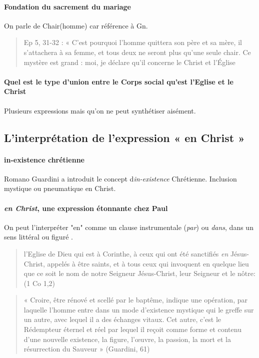  \paragraph{Fondation du sacrement du mariage} On parle de Chair(homme) car référence à Gn. 
 
 \begin{quote}
     Ep 5, 31-32 : « C’est pourquoi l’homme quittera son père et sa mère, il s’attachera à sa femme, et tous deux ne seront plus qu’une seule chair. Ce mystère est grand : moi, je déclare qu’il concerne le Christ et l’Église
 \end{quote}
 
 \paragraph{Quel est le type d'union entre le Corps social qu'est l'Eglise et le Christ} Plusieurs expressions mais qu'on ne peut synthétiser aisément.
 
 \subsection{L’interprétation de l’expression  « en Christ » }
 \paragraph{in-existence chrétienne}
 Romano Guardini a introduit le concept d\textit{in-existence} Chrétienne. Inclusion mystique ou pneumatique en Christ. 
 
 \paragraph{\textit{en Christ}, une expression étonnante chez Paul} On peut l'interpréter "en" comme un clause instrumentale (\textit{par}) ou \textit{dans}, dans un sens littéral ou figuré .
  
 \begin{quote}
      l'Eglise de Dieu qui est à Corinthe, à ceux qui ont été sanctifiés \textit{en} Jésus-Christ, appelés à être saints, et à tous ceux qui invoquent en quelque lieu que ce soit le nom de notre Seigneur Jésus-Christ, leur Seigneur et le nôtre: (1 Co 1,2)
 \end{quote}

 
 \begin{quote}
     « Croire, être rénové et scellé par le baptême, indique une opération, par laquelle l’homme entre dans un mode d’existence mystique qui le greffe sur un autre, avec lequel il a des échanges vitaux. Cet autre, c’est le Rédempteur éternel et réel par lequel il reçoit comme forme et contenu d’une nouvelle existence, la figure, l’œuvre, la passion, la mort et la résurrection du Sauveur » (Guardini, 61)
 \end{quote}

